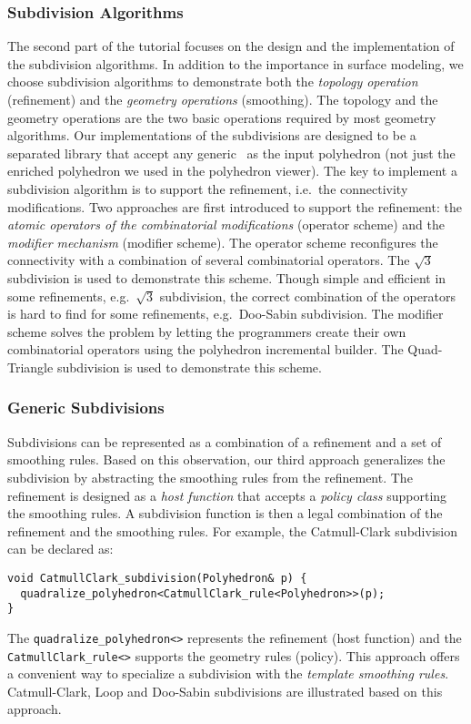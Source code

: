 \documentclass[letter]{article}
\begin{document}
\subsubsection*{Subdivision Algorithms}
The second part of the tutorial focuses on the design and 
the implementation of the subdivision algorithms.
In addition to the importance in surface modeling,
we choose subdivision algorithms to demonstrate
both the \emph{topology operation} (refinement) and the 
\emph{geometry operations} (smoothing). The topology and the geometry
operations are the two basic operations required by
most geometry algorithms. Our implementations of the subdivisions 
are designed to be a separated library that accept 
any generic \poly\ as the input polyhedron (not just the 
enriched polyhedron we used in the polyhedron viewer). The key to implement
a subdivision algorithm is to support the refinement, 
i.e.\ the connectivity modifications.
Two approaches are first introduced to support the refinement:
the \emph{atomic operators of the combinatorial modifications}
(operator scheme) and the \emph{modifier mechanism} (modifier scheme).
The operator scheme reconfigures
the connectivity with a combination of several combinatorial 
operators. The $\sqrt{3}$ subdivision is used to
demonstrate this scheme. Though simple and efficient 
in some refinements, e.g.\ $\sqrt{3}$ 
subdivision, the correct combination of the operators is 
hard to find for some refinements, 
e.g.\ Doo-Sabin subdivision. The modifier scheme
solves the problem by letting the programmers 
create their own combinatorial operators
using the polyhedron incremental builder.
The Quad-Triangle subdivision is used to demonstrate this scheme.

\subsubsection*{Generic Subdivisions}
Subdivisions can be represented
as a combination of a refinement and a set of smoothing
rules. Based on this observation, our third approach 
generalizes the subdivision by abstracting the smoothing rules
from the refinement. The refinement is designed as a \emph{host 
function} that accepts a \emph{policy class} supporting the 
smoothing rules. A subdivision function is then a 
legal combination of the refinement and the smoothing rules.
For example, the Catmull-Clark subdivision can be declared
as: 
\begin{lstlisting}
void CatmullClark_subdivision(Polyhedron& p) {    
  quadralize_polyhedron<CatmullClark_rule<Polyhedron>>(p);  
}
\end{lstlisting}
The \lstinline!quadralize_polyhedron<>! represents the refinement 
(host function) and the \lstinline!CatmullClark_rule<>! supports
the geometry rules (policy).
This approach offers a convenient way to specialize a subdivision 
with the \emph{template smoothing rules}.
Catmull-Clark, Loop and Doo-Sabin subdivisions are 
illustrated based on this approach. 
\end{document}
